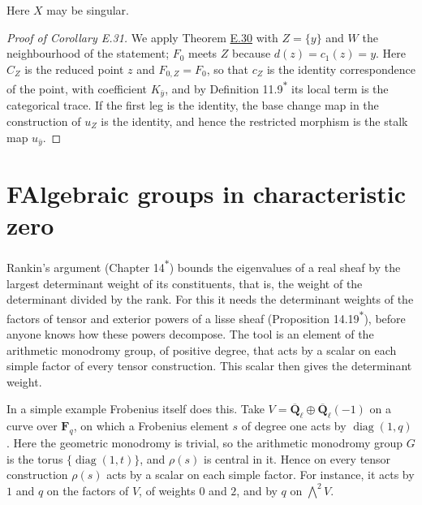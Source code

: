 \documentclass[11pt]{article}
\newcommand{\bpout}[1]{#1\textsuperscript{\hyperlink{bp-outside}{\ensuremath{\ast}}}}
\begin{document}
\label{bp318}%
Here \(X\) may be singular.

\begin{proof}[{Proof of Corollary E.31}]\label{bp319}%
We apply Theorem \hyperref[bp313]{E.30} with \(Z=\{y\}\) and \(W\) the neighbourhood of the statement; \(F_0\) meets \(Z\) because \(d(z)=c_1(z)=y\). Here \(C_Z\) is the reduced point \(z\) and \(F_{0,Z}=F_0\), so that \(c_Z\) is the identity correspondence of the point, with coefficient \(K_{\bar y}\), and by Definition \bpout{11.9} its local term is the categorical trace. If the first leg is the identity, the base change map in the construction of \(u_Z\) is the identity, and hence the restricted morphism is the stalk map \(u_{\bar y}\).
\end{proof}



\section*{\texorpdfstring{F\quad Algebraic groups in characteristic zero}{F Algebraic groups in characteristic zero}}
\label{bp320}%
\label{bp321}%
Rankin's argument (Chapter \bpout{14}) bounds the eigenvalues of a real sheaf by the largest determinant weight of its constituents, that is, the weight of the determinant divided by the rank. For this it needs the determinant weights of the factors of tensor and exterior powers of a lisse sheaf (Proposition \bpout{14.19}), before anyone knows how these powers decompose. The tool is an element of the arithmetic monodromy group, of positive degree, that acts by a scalar on each simple factor of every tensor construction. This scalar then gives the determinant weight.

In a simple example Frobenius itself does this. Take \(V=\overline{\mathbf Q}_\ell\oplus\overline{\mathbf Q}_\ell(-1)\) on a curve over \(\mathbf F_q\), on which a Frobenius element \(s\) of degree one acts by \(\operatorname{diag}(1,q)\). Here the geometric monodromy is trivial, so the arithmetic monodromy group \(G\) is the torus \(\{\operatorname{diag}(1,t)\}\), and \(\rho(s)\) is central in it. Hence on every tensor construction \(\rho(s)\) acts by a scalar on each simple factor. For instance, it acts by \(1\) and \(q\) on the factors of \(V\), of weights \(0\) and \(2\), and by \(q\) on \(\bigwedge^2V\).
\end{document}
